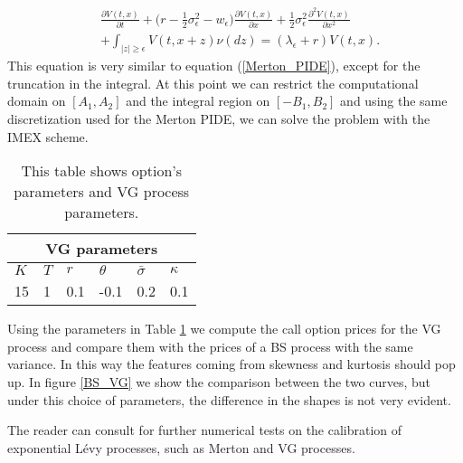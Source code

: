 \begin{align}\label{VG_JD}
&  \frac{\partial V(t,x)}{\partial t} +
 \bigl( r-\frac{1}{2}\sigma_{\epsilon}^2 - w_{\epsilon} \bigr) \frac{\partial V(t,x)}{\partial x} 
 + \frac{1}{2}\sigma_{\epsilon}^2 \frac{\partial^2 V(t,x)}{\partial x^2} \\ \nonumber
 &+ \int_{|z| \geq \epsilon} V(t,x+z) \nu(dz) = (\lambda_{\epsilon} + r) V(t,x).
\end{align}
This equation is very similar to equation (\ref{Merton_PIDE}), except for the truncation in the integral. 
At this point we can restrict the computational domain on $[A_1,A_2]$ and the integral region on $[-B_1,B_2]$ and using the same discretization
used for the Merton PIDE, we can solve the problem with the IMEX scheme.\\
\begin{table}[h!]
\begin{center}
 \begin{minipage}{0.8\linewidth}
  \centering
 \begin{tabular}{||l|l|l|l||l|l||}
\hline
  \multicolumn{6}{|c|}{VG parameters} \\
 \hline
$K$ & $T$ & $r$ & $\theta$ & $\bar\sigma$ &$\kappa$  \\
\hline
15 & 1 & 0.1 & -0.1 & 0.2 & 0.1 \\
\hline
\end{tabular}
  \caption{This table shows option's parameters and VG process parameters.}
  \label{tab:VG}
\end{minipage}
  \end{center}
\end{table}
Using the parameters in Table \ref{tab:VG} we compute the call option prices for the VG process and compare them with the prices of a BS process with the same variance.
In this way the features coming from skewness and kurtosis should pop up.  
In figure \ref{BS_VG} we show the comparison between the two curves, but under this choice of parameters, the difference in the shapes is not very evident.

The reader can consult \cite{Schoutens} for further numerical tests on the calibration of exponential Lévy processes, such as Merton and VG processes. 



